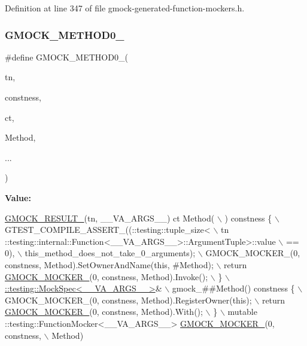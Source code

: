 Definition at line 347 of file gmock-\/generated-\/function-\/mockers.\+h.

\mbox{\label{gmock-generated-function-mockers_8h_ae0d290ffa58d7c624b2e3487ba1252f4}} 
\subsubsection{\texorpdfstring{G\+M\+O\+C\+K\+\_\+\+M\+E\+T\+H\+O\+D0\+\_\+}{GMOCK\_METHOD0\_}}
{\footnotesize\ttfamily \#define G\+M\+O\+C\+K\+\_\+\+M\+E\+T\+H\+O\+D0\+\_\+(\begin{DoxyParamCaption}\item[{}]{tn,  }\item[{}]{constness,  }\item[{}]{ct,  }\item[{}]{Method,  }\item[{}]{... }\end{DoxyParamCaption})}

{\bfseries Value\+:}
\begin{DoxyCode}
\hyperlink{gmock-generated-function-mockers_8h_a0e9d94e9c77df84f1103af06feee1077}{GMOCK\_RESULT\_}(tn, \_\_VA\_ARGS\_\_) ct Method( \(\backslash\)
      ) constness \{ \(\backslash\)
    GTEST\_COMPILE\_ASSERT\_((::testing::tuple\_size<                          \(\backslash\)
        tn ::testing::internal::Function<\_\_VA\_ARGS\_\_>::ArgumentTuple>::value \(\backslash\)
            == 0), \(\backslash\)
        this\_method\_does\_not\_take\_0\_arguments); \(\backslash\)
    GMOCK\_MOCKER\_(0, constness, Method).SetOwnerAndName(\textcolor{keyword}{this}, #Method); \(\backslash\)
    return \hyperlink{gmock-generated-function-mockers_8h_a7d362499e27b1bc3a9806dd3cf58a5b7}{GMOCK\_MOCKER\_}(0, constness, Method).Invoke(); \(\backslash\)
  \} \(\backslash\)
  \hyperlink{classtesting_1_1internal_1_1MockSpec}{::testing::MockSpec<\_\_VA\_ARGS\_\_>}& \(\backslash\)
      gmock\_##Method() constness \{ \(\backslash\)
    GMOCK\_MOCKER\_(0, constness, Method).RegisterOwner(\textcolor{keyword}{this}); \(\backslash\)
    return \hyperlink{gmock-generated-function-mockers_8h_a7d362499e27b1bc3a9806dd3cf58a5b7}{GMOCK\_MOCKER\_}(0, constness, Method).With(); \(\backslash\)
  \} \(\backslash\)
  mutable ::testing::FunctionMocker<\_\_VA\_ARGS\_\_> \hyperlink{gmock-generated-function-mockers_8h_a7d362499e27b1bc3a9806dd3cf58a5b7}{GMOCK\_MOCKER\_}(0, constness, \(\backslash\)
      Method)
\end{DoxyCode}


